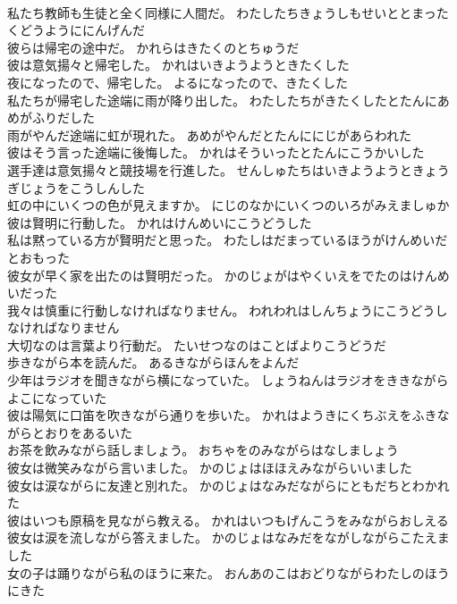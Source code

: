 \documentclass[8pt]{extreport}
\begin{document}
\begin{CJK}{UTF8}{min}
\\	私たち教師も生徒と全く同様に人間だ。	わたしたちきょうしもせいととまったくどうようににんげんだ 
\\	彼らは帰宅の途中だ。	かれらはきたくのとちゅうだ 
\\	彼は意気揚々と帰宅した。	かれはいきようようときたくした 
\\	夜になったので、帰宅した。	よるになったので、きたくした 
\\	私たちが帰宅した途端に雨が降り出した。	わたしたちがきたくしたとたんにあめがふりだした 
\\	雨がやんだ途端に虹が現れた。	あめがやんだとたんににじがあらわれた 
\\	彼はそう言った途端に後悔した。	かれはそういったとたんにこうかいした 
\\	選手達は意気揚々と競技場を行進した。	せんしゅたちはいきようようときょうぎじょうをこうしんした 
\\	虹の中にいくつの色が見えますか。	にじのなかにいくつのいろがみえましゅか 
\\	彼は賢明に行動した。	かれはけんめいにこうどうした 
\\	私は黙っている方が賢明だと思った。	わたしはだまっているほうがけんめいだとおもった 
\\	彼女が早く家を出たのは賢明だった。	かのじょがはやくいえをでたのはけんめいだった 
\\	我々は慎重に行動しなければなりません。	われわれはしんちょうにこうどうしなければなりません 
\\	大切なのは言葉より行動だ。	たいせつなのはことばよりこうどうだ 
\\	歩きながら本を読んだ。	あるきながらほんをよんだ 
\\	少年はラジオを聞きながら横になっていた。	しょうねんはラジオをききながらよこになっていた 
\\	彼は陽気に口笛を吹きながら通りを歩いた。	かれはようきにくちぶえをふきながらとおりをあるいた 
\\	お茶を飲みながら話しましょう。	おちゃをのみながらはなしましょう 
\\	彼女は微笑みながら言いました。	かのじょはほほえみながらいいました 
\\	彼女は涙ながらに友達と別れた。	かのじょはなみだながらにともだちとわかれた 
\\	彼はいつも原稿を見ながら教える。	かれはいつもげんこうをみながらおしえる 
\\	彼女は涙を流しながら答えました。	かのじょはなみだをながしながらこたえました 
\\	女の子は踊りながら私のほうに来た。	おんあのこはおどりながらわたしのほうにきた 

\end{CJK}
\end{document}
